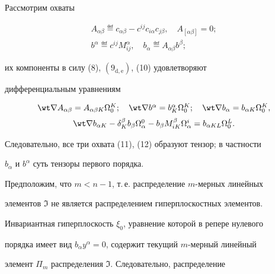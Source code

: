  


Рассмотрим охваты 


\begin{gather} 


A_{\alpha\beta}\eqdef c_{\alpha\beta}-c^{ij}c_{i\alpha} 


c_{j\beta},\quad A_{[\alpha\beta]}=0;\\ 


b^\alpha\eqdef c^{ij}M^\alpha_{ij},\quad 


b_\alpha\eqdef A_{\alpha\beta}b^\beta; 


\end{gather} 


их компоненты в силу (8), $(9_{\mathrm{d,e}})$, (10) удовлетворяют 


дифференциальным уравнениям 


\begin{equation} 


\begin{array}{c} 


\wt\nabla A_{\alpha\beta}=A_{\alpha\beta K}\Omega^K_0;\quad 


\wt\nabla b^\alpha=b^\alpha_K\Omega^K_0;\quad 


\wt \nabla b_\alpha=b_{\alpha K}\Omega^K_0,\\[2mm] 


%


\wt\nabla b_{\alpha K}-\delta^\beta_K b_\beta\Omega^0_\alpha- 


b_\beta M^\beta_{iK}\Omega^i_\alpha=b_{\alpha KL}\Omega^L_0. 


\end{array} 


\end{equation} 


Следовательно, все три охвата (11), (12) образуют тензор; в частности 


$b_\alpha$ и $b^\alpha$ суть тензоры первого порядка. 


 


Предположим, что $m<n-1$, т.\,е. распределение $m$-мерных линейных 


элементов $\Im$ не является распределением гиперплоскостных элементов. 


Инвариантная гиперплоскость $\xi_0$, уравнение которой в репере нулевого 


порядка имеет вид $b_\alpha y^\alpha=0$, содержит текущий $m$-мерный линейный 


элемент $\Pi_m$ распределения $\Im$. Следовательно, распределение 


